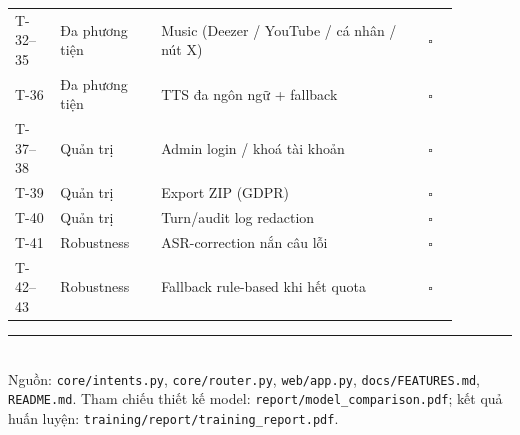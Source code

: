 \documentclass[12pt,a4paper]{article}
\begin{document}
\begin{longtable}{p{0.09\linewidth}p{0.20\linewidth}p{0.53\linewidth}p{0.06\linewidth}}
T-32--35 & Đa phương tiện & Music (Deezer / YouTube / cá nhân / nút X) & $\square$ \\
T-36 & Đa phương tiện & TTS đa ngôn ngữ + fallback & $\square$ \\
T-37--38 & Quản trị & Admin login / khoá tài khoản & $\square$ \\
T-39 & Quản trị & Export ZIP (GDPR) & $\square$ \\
T-40 & Quản trị & Turn/audit log redaction & $\square$ \\
T-41 & Robustness & ASR-correction nắn câu lỗi & $\square$ \\
T-42--43 & Robustness & Fallback rule-based khi hết quota & $\square$ \\
\bottomrule
\end{longtable}

\vfill
\noindent\rule{\linewidth}{0.4pt}\\
\small Nguồn: \texttt{core/intents.py}, \texttt{core/router.py}, \texttt{web/app.py},
\texttt{docs/FEATURES.md}, \texttt{README.md}. Tham chiếu thiết kế model:
\texttt{report/model\_comparison.pdf}; kết quả huấn luyện:
\texttt{training/report/training\_report.pdf}.
\end{document}
